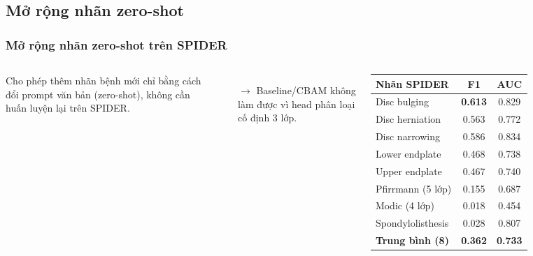 \documentclass{beamer}
\numberwithin{figure}{section}
\numberwithin{table}{section}
\begin{document}
\subsection{Mở rộng nhãn zero-shot}
\begin{frame}
\frametitle{Mở rộng nhãn zero-shot trên SPIDER}
\begin{columns}[t]
\small
Cho phép thêm nhãn bệnh mới chỉ bằng cách đổi prompt văn bản (zero-shot), không cần huấn luyện lại trên SPIDER.
\begin{itemize}\small
    \item[$\rightarrow$] Baseline/CBAM không làm được vì head phân loại cố định 3 lớp.
\end{itemize}
\begin{table}
\centering
\footnotesize
\begin{tabular}{lcc}
\toprule
\textbf{Nhãn SPIDER} & \textbf{F1} & \textbf{AUC} \\
\midrule
Disc bulging        & \textbf{0.613} & 0.829 \\
Disc herniation     & 0.563 & 0.772 \\
Disc narrowing      & 0.586 & 0.834 \\
\midrule
Lower endplate      & 0.468 & 0.738 \\
Upper endplate      & 0.467 & 0.740 \\
Pfirrmann (5 lớp)   & 0.155 & 0.687 \\
Modic (4 lớp)       & 0.018 & 0.454 \\
Spondylolisthesis   & 0.028 & 0.807 \\
\midrule
\textbf{Trung bình (8)} & \textbf{0.362} & \textbf{0.733} \\
\bottomrule
\end{tabular}
\end{table}
\end{columns}
\end{frame}
\end{document}
